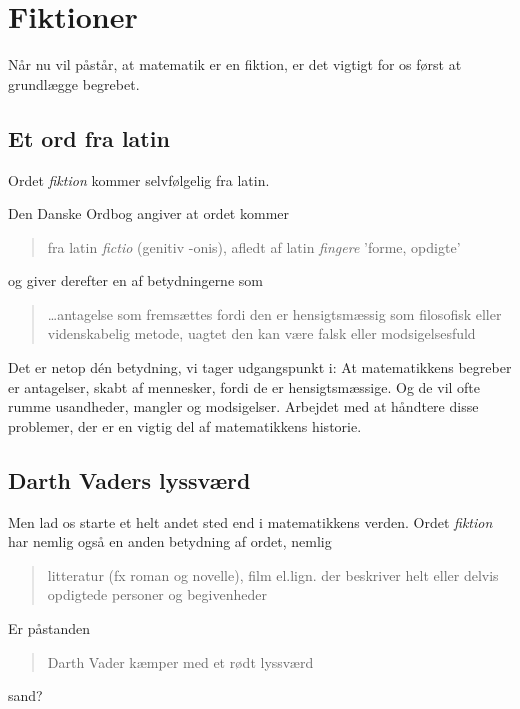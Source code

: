 \chapter{Fiktioner}

Når nu vil påstår, at matematik er en fiktion, er det vigtigt for os først at grundlægge begrebet.

\section{Et ord fra latin}

Ordet \emph{fiktion} kommer selvfølgelig fra latin.

Den Danske Ordbog \cite{ordnet} angiver at ordet kommer

\begin{quote}
   fra latin \textsl{fictio} (genitiv -onis), afledt af latin \textsl{fingere} 'forme, opdigte' 
\end{quote}
 
og giver derefter en af betydningerne som
 
 \begin{quote}
     \ldots antagelse som fremsættes fordi den er hensigtsmæssig som filosofisk eller videnskabelig metode, uagtet den kan være falsk eller modsigelsesfuld
 \end{quote}
 
 Det er netop dén betydning, vi tager udgangspunkt i: At matematikkens begreber er antagelser, skabt af mennesker, fordi de er hensigtsmæssige. Og de vil ofte rumme usandheder, mangler og modsigelser. Arbejdet med at håndtere disse problemer, der er en vigtig del af matematikkens historie.
 
\section{Darth Vaders lyssværd}

Men lad os starte et helt andet sted end i matematikkens verden. Ordet \emph{fiktion} har nemlig også en anden betydning af ordet, nemlig \cite{ordnet}

\begin{quote}
    litteratur (fx roman og novelle), film el.lign. der beskriver helt eller delvis opdigtede personer og begivenheder
\end{quote}

Er påstanden 

\begin{quote}
    Darth Vader kæmper med et rødt lyssværd
\end{quote}
sand?

